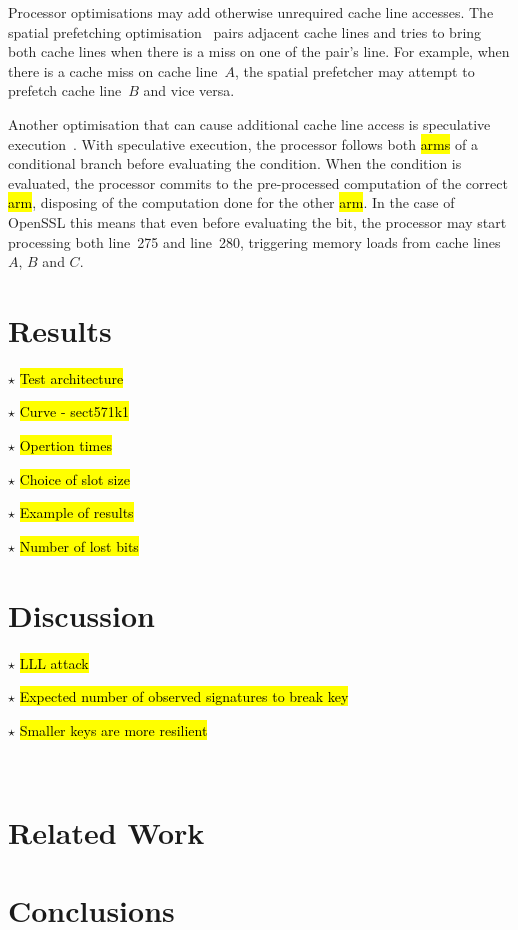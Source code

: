 \documentclass{llncs}
\newcommand{\starpar}[1]{\par{\footnotesize $\star$ \hl{#1}\par}}
\begin{document}
Processor optimisations may add otherwise unrequired cache line accesses.
The spatial prefetching optimisation~\cite{intel12optimization} pairs adjacent cache lines and tries to bring both cache lines
when there is a miss on one of the pair's line.
For example, when there is a cache miss on cache line~$A$, the spatial prefetcher may attempt to prefetch cache line~$B$
and vice versa.

Another optimisation that can cause additional cache line access is speculative execution~\cite{uht95disjoint}.
With speculative execution, the processor follows both \hl{arms} of a conditional branch before evaluating
the condition.
When the condition is evaluated, the processor commits to the pre-processed computation of the correct \hl{arm},
disposing of the computation done for the other \hl{arm}. 
In the case of OpenSSL this means that even before evaluating the bit, 
the processor may start processing both line~275 and line~280, triggering memory loads from cache lines~$A$, $B$ and $C$.




\section{Results}

\starpar{Test architecture}
\starpar{Curve - sect571k1}
\starpar{Opertion times}
\starpar{Choice of slot size}
\starpar{Example of results}
\starpar{Number of lost bits}
\section{Discussion}
\starpar{LLL attack}
\starpar{Expected number of observed signatures to break key}
\starpar{Smaller keys are more resilient}~\cite{walter04longer}
\section{Related Work}
\section{Conclusions}




\end{document}
